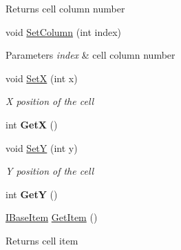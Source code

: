 \begin{DoxyCompactItemize}
\begin{DoxyCompactList}
\begin{DoxyReturn}{Returns}
cell column number 
\end{DoxyReturn}
\end{DoxyCompactList}\item 
\mbox{\label{class_space_v_i_l_1_1_cell_aabe61a18c9e5de3d0c8735171649c269}} 
void \mbox{\hyperlink{class_space_v_i_l_1_1_cell_aabe61a18c9e5de3d0c8735171649c269}{Set\+Column}} (int index)
\begin{DoxyCompactList}\small\item\em 
\begin{DoxyParams}{Parameters}
{\em index} & cell column number \\
\hline
\end{DoxyParams}
\end{DoxyCompactList}\item 
void \mbox{\hyperlink{class_space_v_i_l_1_1_cell_aa6cdc40507c12d0e0bb40e7daa59ab83}{SetX}} (int x)
\begin{DoxyCompactList}\small\item\em X position of the cell \end{DoxyCompactList}\item 
\mbox{\label{class_space_v_i_l_1_1_cell_a6643259b0e38e58e6ba4cc81ee26a549}} 
int {\bfseries GetX} ()
\item 
void \mbox{\hyperlink{class_space_v_i_l_1_1_cell_a1876cc8c7d5b4ad383df1fe2330366f8}{SetY}} (int y)
\begin{DoxyCompactList}\small\item\em Y position of the cell \end{DoxyCompactList}\item 
\mbox{\label{class_space_v_i_l_1_1_cell_a2c193cc053ca87513b5d88e917f1b197}} 
int {\bfseries GetY} ()
\item 
\mbox{\label{class_space_v_i_l_1_1_cell_aadd83fb3bde0ce98c3e78af3b7b33ba6}} 
\mbox{\hyperlink{interface_space_v_i_l_1_1_core_1_1_i_base_item}{I\+Base\+Item}} \mbox{\hyperlink{class_space_v_i_l_1_1_cell_aadd83fb3bde0ce98c3e78af3b7b33ba6}{Get\+Item}} ()
\begin{DoxyCompactList}\small\item\em \begin{DoxyReturn}{Returns}
cell item 
\end{DoxyReturn}

\end{DoxyCompactList}
\end{DoxyCompactItemize}
